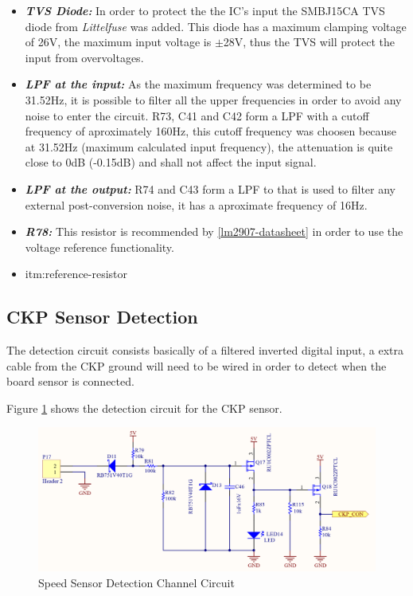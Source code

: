 			\begin{itemize}
				\item\textit{\textbf{TVS Diode:}} In order to protect the the IC's input the SMBJ15CA TVS diode from \textit{Littelfuse} was added. This diode has a maximum clamping voltage of 26V, the maximum input voltage is $\pm$28V, thus the TVS will protect the input from overvoltages.\label{itm:ckp-circuit-tvs}
				\item\textit{\textbf{LPF at the input:}} As the maximum frequency was determined to be 31.52Hz, it is possible to filter all the upper frequencies in order to avoid any noise to enter the circuit. R73, C41 and C42 form a LPF with a cutoff frequency of aproximately 160Hz, this cutoff frequency was choosen because at 31.52Hz (maximum calculated input frequency), the attenuation is quite close to 0dB (-0.15dB) and shall not affect the input signal.\label{itm:ckp-circuit-lpf-input}
				\item\textit{\textbf{LPF at the output:}} R74 and C43 form a LPF to that is used to filter any external post-conversion noise, it has a aproximate frequency of 16Hz.\label{itm:ckp-circuit-lpf-output} 
				\item\textit{\textbf{R78:}} This resistor is recommended by \ref{lm2907-datasheet} in order to use the voltage reference functionality.\item{itm:reference-resistor}
			\end{itemize}


	\subsection{CKP Sensor Detection}\label{ssec:ckp-sensor-detection-circuit}

		The detection circuit consists basically of a filtered inverted digital input, a extra cable from the CKP ground will need to be wired in order to detect when the board sensor is connected.

		Figure \ref{fig:ckp-detection-circuit} shows the detection circuit for the CKP sensor.

			\begin{figure}[htbp]
				\centering
					\includegraphics[scale=0.6]{figuras/fig-ckp-detection-circuit}
				\caption{Speed Sensor Detection Channel Circuit}
				\label{fig:ckp-detection-circuit}
			\end{figure}


